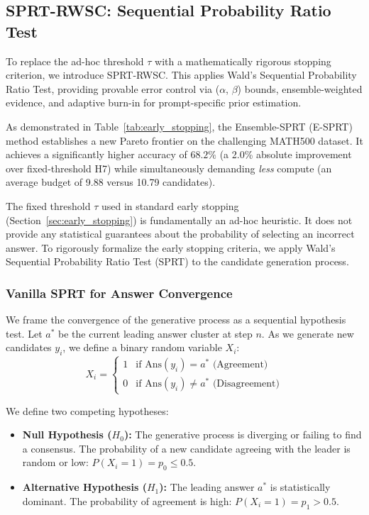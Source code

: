 \documentclass[a4paper,11pt]{article}
\begin{document}
\subsection{SPRT-RWSC: Sequential Probability Ratio Test}
To replace the ad-hoc threshold $\tau$ with a mathematically rigorous stopping criterion, we introduce SPRT-RWSC. This applies Wald's Sequential Probability Ratio Test, providing provable error control via ($\alpha$, $\beta$) bounds, ensemble-weighted evidence, and adaptive burn-in for prompt-specific prior estimation. 

As demonstrated in Table~\ref{tab:early_stopping}, the Ensemble-SPRT (E-SPRT) method establishes a new Pareto frontier on the challenging MATH500 dataset. It achieves a significantly higher accuracy of $68.2\%$ (a 2.0\% absolute improvement over fixed-threshold H7) while simultaneously demanding \emph{less} compute (an average budget of 9.88 versus 10.79 candidates).

\label{sec:math_sprt}
The fixed threshold $\tau$ used in standard early stopping (Section~\ref{sec:early_stopping}) is fundamentally an ad-hoc heuristic. It does not provide any statistical guarantees about the probability of selecting an incorrect answer. To rigorously formalize the early stopping criteria, we apply Wald's Sequential Probability Ratio Test (SPRT) to the candidate generation process.

\subsubsection{Vanilla SPRT for Answer Convergence}
We frame the convergence of the generative process as a sequential hypothesis test. Let $a^*$ be the current leading answer cluster at step $n$. As we generate new candidates $y_i$, we define a binary random variable $X_i$:
\begin{equation}
X_i = 
\begin{cases} 
1 & \text{if } \text{Ans}(y_i) = a^* \text{ (Agreement)} \\
0 & \text{if } \text{Ans}(y_i) \neq a^* \text{ (Disagreement)}
\end{cases}
\end{equation}

We define two competing hypotheses:
\begin{itemize}
    \item \textbf{Null Hypothesis ($H_0$):} The generative process is diverging or failing to find a consensus. The probability of a new candidate agreeing with the leader is random or low: $P(X_i = 1) = p_0 \leq 0.5$.
    \item \textbf{Alternative Hypothesis ($H_1$):} The leading answer $a^*$ is statistically dominant. The probability of agreement is high: $P(X_i = 1) = p_1 > 0.5$.
\end{itemize}
\end{document}

